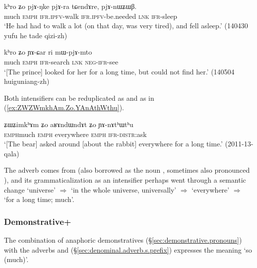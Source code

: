 \begin{exe}
\ex \label{ex:khro.Zo.pjANke}
\gll kʰro ʑo pjɤ-ŋke pjɤ-ra tɕendɤre, pjɤ-nɯʑɯβ. \\
much \textsc{emph} \textsc{ifr}.\textsc{ipfv}-walk \textsc{ifr}.\textsc{ipfv}-be.needed \textsc{lnk} \textsc{ifr}-sleep \\
\glt `He had had to walk a lot (on that day, was very tired), and fell asleep.' (140430 yufu he tade qizi-zh)
\end{exe}

\begin{exe}
\ex \label{ex:khro.Zo.YACar}
\gll kʰro ʑo ɲɤ-ɕar ri mɯ-pjɤ-mto \\
much \textsc{emph} \textsc{ifr}-search \textsc{lnk} \textsc{neg}-\textsc{ifr}-see \\
\glt `[The prince] looked for her for a long time, but could not find her.' (140504 huiguniang-zh)
\end{exe}

Both intensifiers can be reduplicated as  and  as in (\ref{ex:ZWZWmkhAm.Zo.YAnAthWthu}).

\begin{exe} 
\ex \label{ex:ZWZWmkhAm.Zo.YAnAthWthu}
\gll ʑɯ\redp{}ʑimkʰɤm ʑo aʁɤndɯndɤt ʑo ɲɤ-nɤtʰɯtʰu \\
\textsc{emph}\redp{}much \textsc{emph} everywhere \textsc{emph} \textsc{ifr}-\textsc{distr}:ask \\
\glt `[The bear] asked around [about the rabbit] everywhere for a long time.' (2011-13-qala)
\end{exe}

The adverb  comes from  (also borrowed as the noun , sometimes also pronounced ), and its grammaticalization as an intensifier perhaps went through a semantic change `universe' $\Rightarrow$ `in the whole universe, universally' $\Rightarrow$ `everywhere' $\Rightarrow$ `for a long time; much'.

\subsubsection{Demonstrative+} \label{sec:nWtshWci}
The combination of anaphoric demonstratives (§\ref{sec:demonstrative.pronouns}) with the adverbs  and  (§\ref{sec:denominal.adverb.s.prefix}) expresses the meaning `so (much)'.

